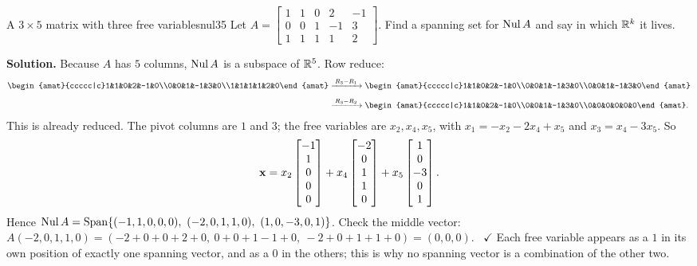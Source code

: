 \documentclass[11pt]{article}
\begin{document}
\begin{exmp}{A $3\times5$ matrix with three free variables}{nul35}
Let $A=\begin{bmatrix}1&1&0&2&-1\\0&0&1&-1&3\\1&1&1&1&2\end{bmatrix}$. Find a spanning set for $\operatorname{Nul} A$ and say in which $\mathbb{R}^k$ it lives.

\textbf{Solution.} Because $A$ has $5$ columns, $\operatorname{Nul} A$ is a subspace of $\mathbb{R}^5$. Row reduce:
\begin{align*}
\begin{amat}{ccccc|c}1&1&0&2&-1&0\\0&0&1&-1&3&0\\1&1&1&1&2&0\end{amat}
&\rops{R_3-R_1}
\begin{amat}{ccccc|c}1&1&0&2&-1&0\\0&0&1&-1&3&0\\0&0&1&-1&3&0\end{amat}\\[4pt]
&\rops{R_3-R_2}
\begin{amat}{ccccc|c}1&1&0&2&-1&0\\0&0&1&-1&3&0\\0&0&0&0&0&0\end{amat}.
\end{align*}
This is already reduced. The pivot columns are $1$ and $3$; the free variables are $x_2,x_4,x_5$, with $x_1=-x_2-2x_4+x_5$ and $x_3=x_4-3x_5$. So
\[
\mathbf{x}=x_2\begin{bmatrix}-1\\1\\0\\0\\0\end{bmatrix}+x_4\begin{bmatrix}-2\\0\\1\\1\\0\end{bmatrix}+x_5\begin{bmatrix}1\\0\\-3\\0\\1\end{bmatrix}.
\]
Hence $\Nul A=\Span\{(-1,1,0,0,0),\ (-2,0,1,1,0),\ (1,0,-3,0,1)\}$. Check the middle vector: $A(-2,0,1,1,0)=(-2+0+0+2+0,\ 0+0+1-1+0,\ -2+0+1+1+0)=(0,0,0)$. \ $\checkmark$ Each free variable appears as a $1$ in its own position of exactly one spanning vector, and as a $0$ in the others; this is why no spanning vector is a combination of the other two.
\end{exmp}
\end{document}
